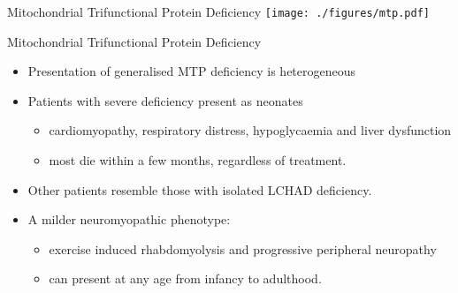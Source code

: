 \documentclass[presentation, smaller]{beamer}
\begin{document}
\begin{frame}[label={sec:orgheadline20}]{Mitochondrial Trifunctional Protein Deficiency}
\texttt{[image: ./figures/mtp.pdf]}
\end{frame}
\begin{frame}[label={sec:orgheadline21}]{Mitochondrial Trifunctional Protein Deficiency}
\begin{itemize}
\item Presentation of generalised MTP deficiency is heterogeneous
\item Patients with severe deficiency present as neonates
\begin{itemize}
\item cardiomyopathy, respiratory distress, hypoglycaemia and liver dysfunction
\item most die within a few months, regardless of treatment.
\end{itemize}
\item Other patients resemble those with isolated LCHAD deficiency.
\item A milder neuromyopathic phenotype:
\begin{itemize}
\item exercise induced rhabdomyolysis and progressive peripheral
neuropathy
\item can present at any age from infancy to adulthood.
\end{itemize}
\end{itemize}
\end{frame}
\end{document}
